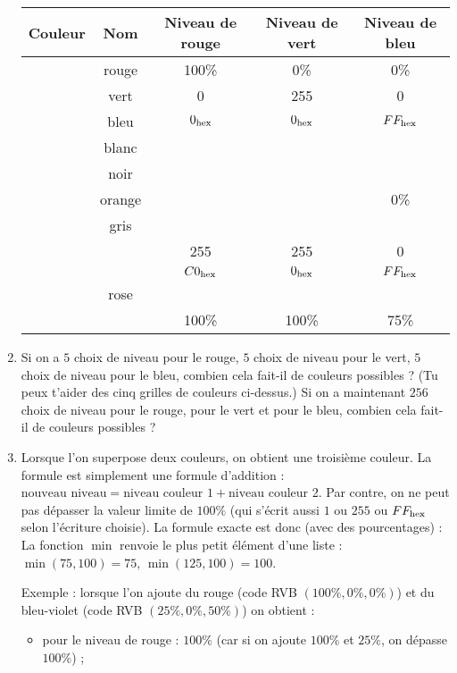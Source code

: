 \documentclass[class=report,crop=false, 12pt]{standalone}
\begin{document}
\begin{activite}
\begin{enumerate}
\begin{center}
\begin{tabular}{|c|c|c|c|c|}
\hline
Couleur & Nom & Niveau de rouge & Niveau de vert & Niveau de bleu \\ \hline
\cellcolor{red}  & rouge  & 100\% & 0\% & 0\% \\ \hline
\cellcolor{green}& vert  & 0 & 255 & 0 \\ \hline
\cellcolor{blue} & bleu   & $0_{\text{hex}}$ & $0_{\text{hex}}$ & $FF_{\text{hex}}$ \\ \hline
                 & blanc  &  &  &   \\ \hline
                 & noir   &  &  &   \\ \hline
                 & orange &  &  & 0\% \\ \hline  
                 & gris   &  &  &     \\ \hline
                 &        & 255 & 255 & 0 \\ \hline
                 &        & $C0_{\text{hex}}$ & $0_{\text{hex}}$ & $FF_{\text{hex}}$ \\ \hline
                 & rose   &  &  &   \\ \hline
                 &        & 100\% & 100\% & 75\% \\ \hline
\end{tabular}
\end{center} 
  
  \item Si on a $5$ choix de niveau pour le rouge, $5$ choix de niveau pour le vert, $5$ choix de niveau pour le bleu, combien cela fait-il de couleurs possibles ? (Tu peux t'aider des cinq grilles de couleurs ci-dessus.) Si on a maintenant $256$ choix de niveau pour le rouge, pour le vert et pour le bleu, combien cela fait-il de couleurs possibles ?
  
  
  \item Lorsque l'on superpose deux couleurs, on obtient une troisième couleur. La formule est simplement une formule d'addition : $\text{nouveau niveau} = \text{niveau couleur 1} + \text{niveau couleur 2}$.
Par contre, on ne peut pas dépasser la valeur limite de $100\%$ (qui s'écrit aussi $1$ ou $255$ 
ou $FF_{\text{hex}}$ selon l'écriture choisie).
La formule exacte est donc (avec des pourcentages) :
 La fonction \og $\min$ \fg{} renvoie le plus petit élément d'une liste : $\min(75,100)= 75$, $\min(125,100)=100$.

Exemple : lorsque l'on ajoute du rouge (code RVB $(100\%,0\%,0\%)$) et du bleu-violet (code RVB $(25\%,0\%,50\%)$)
on obtient :
\begin{itemize}
  \item pour le niveau de rouge : $100\%$ (car si on ajoute $100\%$ et $25\%$, on dépasse $100\%$) ;
  

\end{itemize}
\end{enumerate}
\end{activite}
\end{document}
